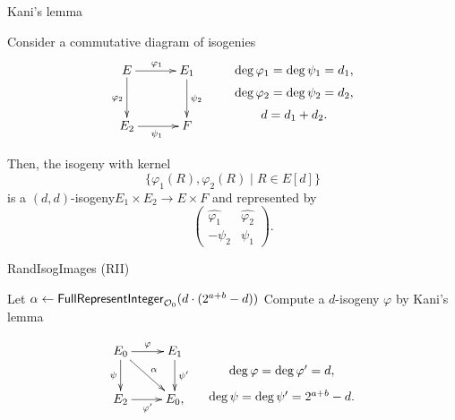 \begin{frame}{Kani's lemma}
    \begin{lemma}
        Consider a commutative diagram of isogenies
        \vspace{-10pt}
        \begin{align*}
            \xymatrix@C=30pt@R=30pt{
                E \ar[r]^{\varphi_1} \ar[d]_{\varphi_2} & E_1 \ar[d]^{\psi_2}\\
                E_2 \ar[r]_{\psi_1} & F
            }
            \qquad
            \xymatrix@R=0.3em{
                \deg\varphi_1 = \deg\psi_1 = d_1,\\
                \deg\varphi_2 = \deg\psi_2 = d_2,\\
                d = d_1 + d_2.
            }
        \end{align*}

        Then, the isogeny with kernel
        $$\{\varphi_1(R), \varphi_2(R) \mid R \in E[d]\}$$
        is a $(d,d)$-isogeny$E_1 \times E_2 \to E \times F$ and represented by
        \vspace{-10pt}
        \begin{equation*}
            \begin{pmatrix}
                \hat{\varphi_1} & \hat{\varphi_2}\\
                -\psi_2 & \psi_1
            \end{pmatrix}.
        \end{equation*}
    \end{lemma}
\end{frame}

\begin{frame}{RandIsogImages (RII)}
    \begin{algorithm}[H]
        \caption{\textsf{RandIsogImages} \cite{C:NakOnu24}}
        \BlankLine
        Let $\alpha \leftarrow \textsf{FullRepresentInteger}_{\mathcal{O}_0}(d\cdot(2^{a+b} - d))$\;
        Compute a $d$-isogeny $\varphi$ by Kani's lemma\;
        \Return{$\varphi$}\;
    \end{algorithm}

    \vspace*{5pt}
    \begin{equation*}
        \xymatrix{
            E_0 \ar[r]^\varphi \ar[d]_\psi \ar[dr]^{\alpha} & E_1 \ar[d]^{\psi'} \\
            E_2 \ar[r]_{\varphi'} & E_0,
        }
        \hspace*{10pt}
        \xymatrix@R=5pt{
            \\
            \deg\varphi = \deg\varphi' = d,\\
            \deg\psi = \deg\psi' = 2^{a+b} - d.
        }
    \end{equation*}
\end{frame}